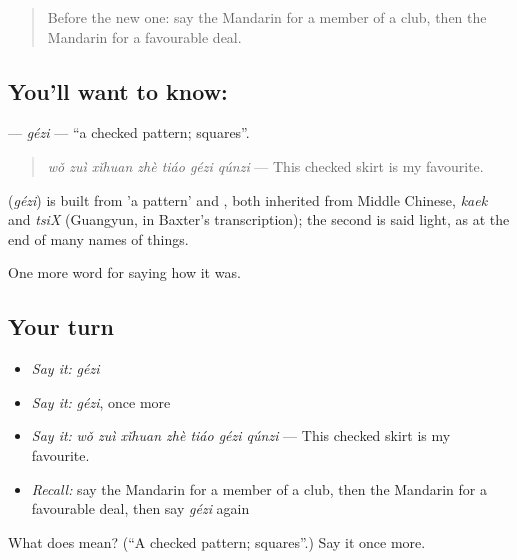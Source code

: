\label{lesson:ZH-C527-gezi}



\begin{quote}
Before the new one: say the Mandarin for a member of a club, then the Mandarin for a favourable deal.
\end{quote}

\subsection*{You'll want to know: }
\textbf{} — \emph{gézi} — \textquotedblleft{}a checked pattern; squares\textquotedblright{}.

\begin{quote}
\emph{wǒ zuì xǐhuan zhè tiáo gézi qúnzi} — This checked skirt is my favourite.
\end{quote}

\begin{cousinweb}
\textbf{} (\emph{gézi}) is built from  'a pattern' and , both inherited from Middle Chinese, \emph{kaek} and \emph{tsiX} (Guangyun, in Baxter's transcription); the second is said light, as at the end of many names of things.
\end{cousinweb}

\begin{grammarlens}[title={What you've built}]
One more word for saying how it was.
\end{grammarlens}

\subsection*{Your turn}
\begin{itemize}
\raggedright
  \item \emph{Say it:} \emph{gézi}
  \item \emph{Say it:} \emph{gézi}, once more
  \item \emph{Say it:} \emph{wǒ zuì xǐhuan zhè tiáo gézi qúnzi} — This checked skirt is my favourite.
  \item \emph{Recall:} say the Mandarin for a member of a club, then the Mandarin for a favourable deal, then say \emph{gézi} again
\end{itemize}

\begin{tcolorbox}[breakable,colback=teal!4,colframe=teal!35!black,title={Before you move on}]
What does  mean? (\textquotedblleft{}A checked pattern; squares\textquotedblright{}.) Say it once more.
\end{tcolorbox}
